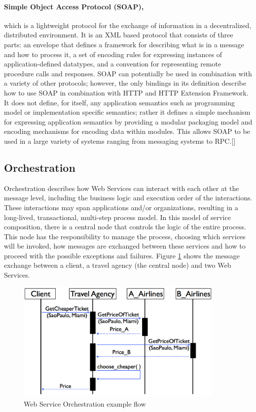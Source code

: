 \paragraph{Simple Object Access Protocol (SOAP),}
which is a lightweight protocol for the exchange of information in a decentralized, distributed environment. It is an XML based protocol that consists of three parts: an envelope that defines a framework for describing what is in a message and how to process it, a set of encoding rules for expressing instances of application-defined datatypes, and a convention for representing remote procedure calls and responses. SOAP can potentially be used in combination with a variety of other protocols; however, the only bindings in its definition describe how to use SOAP in combination with HTTP and HTTP Extension Framework. It does not define, for itself, any application semantics such as programming model or implementation specific semantics; rather it defines a simple mechanism for expressing application semantics by providing a modular packaging model and encoding mechanisms for encoding data within modules. This allows SOAP to be used in a large variety of systems ranging from messaging systems to RPC.[\citet{SOAP}]

\subsection{Orchestration}
Orchestration describes how Web Services can interact with each other at the message level, including the business logic and execution order of the interactions. These interactions may span applications and/or organizations, resulting in a long-lived, transactional, multi-step process model. In this model of service composition, there is a central node that controls the logic of the entire process. This node has the responsibility to manage the process, choosing which services will be invoked, how messages are exchanged between these services and how to proceed with the possible exceptions and failures. Figure \ref{BPELexample} shows the message exchange between a client, a travel agency (the central node) and two Web Services.

\begin{figure}[h]
  \centering
  \includegraphics[width=0.9\textwidth]{images/BPELexample}
  \caption{Web Service Orchestration example flow}
  \label{BPELexample}
\end{figure}

